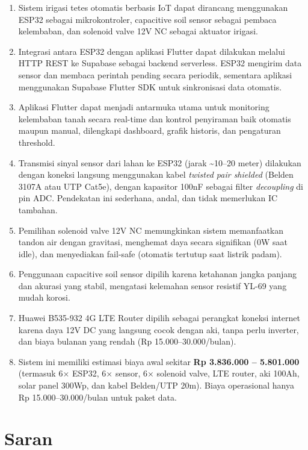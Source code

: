 \documentclass[12pt,a4paper,oneside]{report}
\begin{document}
\begin{enumerate}
    \item Sistem irigasi tetes otomatis berbasis IoT dapat dirancang menggunakan ESP32 sebagai mikrokontroler, capacitive soil sensor sebagai pembaca kelembaban, dan solenoid valve 12V NC sebagai aktuator irigasi.
    \item Integrasi antara ESP32 dengan aplikasi Flutter dapat dilakukan melalui HTTP REST ke Supabase sebagai backend serverless. ESP32 mengirim data sensor dan membaca perintah pending secara periodik, sementara aplikasi menggunakan Supabase Flutter SDK untuk sinkronisasi data otomatis.
    \item Aplikasi Flutter dapat menjadi antarmuka utama untuk monitoring kelembaban tanah secara real-time dan kontrol penyiraman baik otomatis maupun manual, dilengkapi dashboard, grafik historis, dan pengaturan threshold.
    \item Transmisi sinyal sensor dari lahan ke ESP32 (jarak \textasciitilde10--20 meter) dilakukan dengan koneksi langsung menggunakan kabel \textit{twisted pair shielded} (Belden 3107A atau UTP Cat5e), dengan kapasitor 100nF sebagai filter \textit{decoupling} di pin ADC. Pendekatan ini sederhana, andal, dan tidak memerlukan IC tambahan.
    \item Pemilihan solenoid valve 12V NC memungkinkan sistem memanfaatkan tandon air dengan gravitasi, menghemat daya secara signifikan (0W saat idle), dan menyediakan fail-safe (otomatis tertutup saat listrik padam).
    \item Penggunaan capacitive soil sensor dipilih karena ketahanan jangka panjang dan akurasi yang stabil, mengatasi kelemahan sensor resistif YL-69 yang mudah korosi.
    \item Huawei B535-932 4G LTE Router dipilih sebagai perangkat koneksi internet karena daya 12V DC yang langsung cocok dengan aki, tanpa perlu inverter, dan biaya bulanan yang rendah (Rp 15.000--30.000/bulan).
    \item Sistem ini memiliki estimasi biaya awal sekitar \textbf{Rp 3.836.000 -- 5.801.000} (termasuk 6× ESP32, 6× sensor, 6× solenoid valve, LTE router, aki 100Ah, solar panel 300Wp, dan kabel Belden/UTP 20m). Biaya operasional hanya Rp 15.000--30.000/bulan untuk paket data.
\end{enumerate}

\section{Saran}
\end{document}
